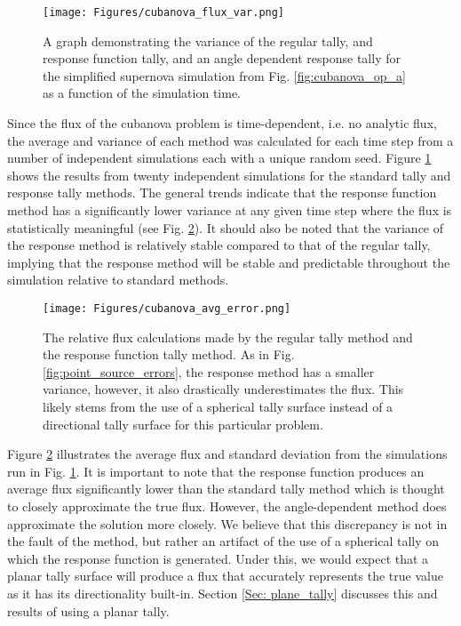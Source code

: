 \begin{chapabstract}
\begin{figure} [h!]
	\centering
	\texttt{[image: Figures/cubanova\_flux\_var.png]}
	\caption{A graph demonstrating the variance of the regular tally, and response function tally, and an angle dependent response tally for the simplified supernova simulation from Fig. \ref{fig:cubanova_op_a} as a function of the simulation time.}
	\label{fig:cubanova_flux_var}
\end{figure}

Since the flux of the cubanova problem is time-dependent, i.e. no analytic flux, the average and variance of each method was calculated for each time step from a number of independent simulations each with a unique random seed. Figure \ref{fig:cubanova_flux_var} shows the results from twenty independent simulations for the standard tally and response tally methods. The general trends indicate that the response function method has a significantly lower variance at any given time step where the flux is statistically meaningful (see Fig. \ref{fig:cubanova_avg_error}). It should also be noted that the variance of the response method is relatively stable compared to that of the regular tally, implying that the response method will be stable and predictable throughout the simulation relative to standard methods. 

\begin{figure} [h!]
	\centering
	\texttt{[image: Figures/cubanova\_avg\_error.png]}
	\caption{The relative flux calculations made by the regular tally method and the response function tally method. As in Fig. \ref{fig:point_source_errors}, the response method has a smaller variance, however, it also drastically underestimates the flux. This likely stems from the use of a spherical tally surface instead of a directional tally surface for this particular problem.}
	\label{fig:cubanova_avg_error}
\end{figure}

Figure \ref{fig:cubanova_avg_error} illustrates the average flux and standard deviation from the simulations run in Fig. \ref{fig:cubanova_flux_var}. It is important to note that the response function produces an average flux significantly lower than the standard tally method which is thought to closely approximate the true flux. However, the angle-dependent method does approximate the solution more closely. We believe that this discrepancy is not in the fault of the method, but rather an artifact of the use of a spherical tally on which the response function is generated. Under this, we would expect that a planar tally surface will produce a flux that accurately represents the true value as it has its directionality built-in. Section \ref{Sec: plane_tally} discusses this and results of using a planar tally.


\end{chapabstract}
